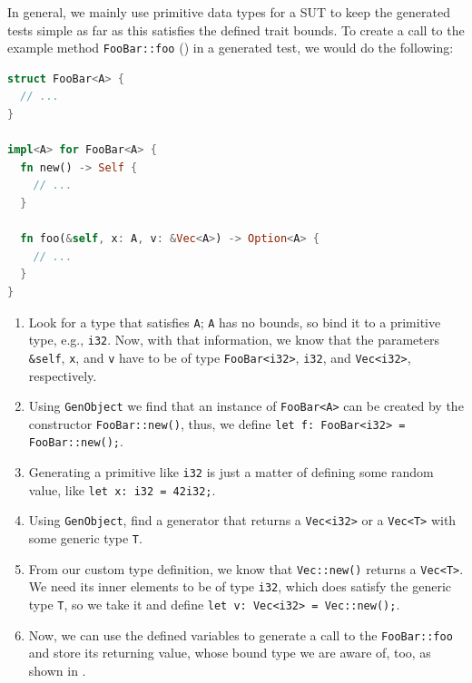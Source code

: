 \documentclass[paper=a4,%
  twoside,%
  BCOR4mm,%
  abstract=true,%
  toc=bibliography,%
  chapterprefix=true,%
  toc=bibliographynumbered,%
  open=right,%
  english,%
  pagesize=pdftex]{scrreprt}
\begin{document}

In general, we mainly use primitive data types for a \ac{SUT} to keep the generated tests simple as far as this satisfies the defined trait bounds. To create a call to the example method \lstinline{FooBar::foo} () in a generated test, we would do the following:

\begin{lstlisting}[language=Rust, style=boxed, caption={A generic type A is used in multiple parameters and return value}, label=lst:generic-type-used-in-multiple-params]
struct FooBar<A> { 
  // ...
}

impl<A> for FooBar<A> {
  fn new() -> Self {
    // ...
  }

  fn foo(&self, x: A, v: &Vec<A>) -> Option<A> {
    // ...
  }
}
\end{lstlisting}

\begin{enumerate}
    \item Look for a type that satisfies \lstinline{A}; \lstinline{A} has no bounds, so bind it to a primitive type, e.g., \lstinline{i32}. Now, with that information, we know that the parameters \lstinline{&self}, \lstinline{x}, and \lstinline{v} have to be of type \lstinline{FooBar<i32>}, \lstinline{i32}, and \lstinline{Vec<i32>}, respectively.
    \item Using \lstinline{GenObject} we find that an instance of \lstinline{FooBar<A>} can be created by the constructor \lstinline{FooBar::new()}, thus, we define \lstinline{let f: FooBar<i32> = FooBar::new();}.
    \item Generating a primitive like \lstinline{i32} is just a matter of defining some random value, like \lstinline{let x: i32 = 42i32;}.
    \item Using \lstinline{GenObject}, find a generator that returns a \lstinline{Vec<i32>} or a \lstinline{Vec<T>} with some generic type \lstinline{T}.
    \item From our custom type definition, we know that \lstinline{Vec::new()} returns a \lstinline{Vec<T>}. We need its inner elements to be of type \lstinline{i32}, which does satisfy the generic type \lstinline{T}, so we take it and define \lstinline{let v: Vec<i32> = Vec::new();}.
    \item Now, we can use the defined variables to generate a call to the \lstinline{FooBar::foo} and store its returning value, whose bound type we are aware of, too, as shown in .
\end{enumerate}
\end{document}
